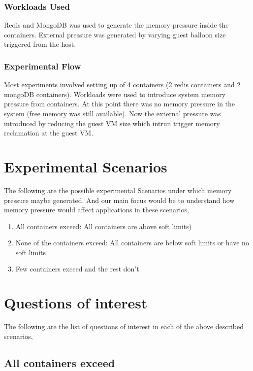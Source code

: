      \subsubsection{Workloads Used}
	
	Redis and MongoDB was used to generate the memory pressure inside the containers. External pressure was generated by varying guest 
balloon size triggered from the host.

      \subsubsection{Experimental Flow}
	
	Most experiments involved setting up of 4 containers (2 redis containers and 2 mongoDB containers). Workloads were used to 
introduce system memory pressure from containers. At this point there was no memory pressure in the system (free memory was still 
available). Now the external pressure was introduced by reducing the guest VM size which intrun trigger memory reclamation at the guest VM. 

  \section{Experimental Scenarios}
    
    The following are the possible experimental Scenarios under which memory pressure maybe generated. And our main focus would be to 
understand how memory pressure would affect applications in these scenarios,

    \begin{enumerate}
      \item All containers exceed: All containers are above soft limits)
      \item None of the containers exceed: All containers are below soft limits or have no soft limits
      \item Few containers exceed and the rest don't
    \end{enumerate}
  
  \section{Questions of interest}
    \label{section_questions}
  
    The following are the list of questions of interest in each of the above described scenarios,
    
    \subsection{All containers exceed}
      
